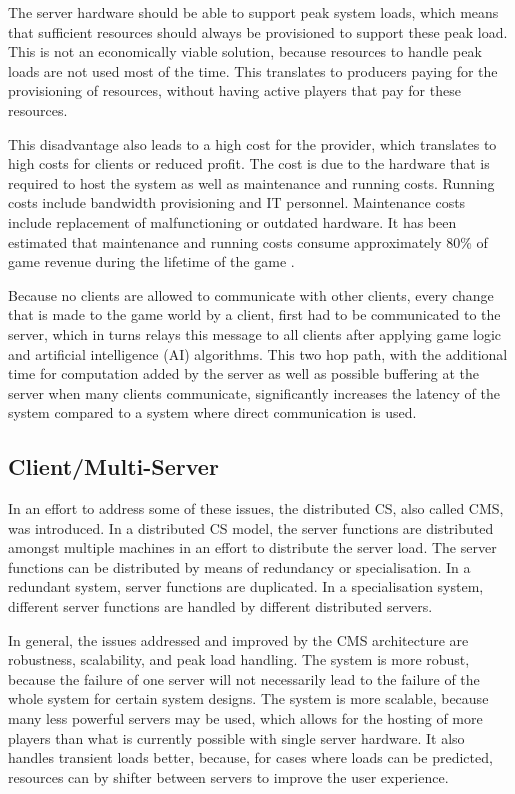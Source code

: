 \documentclass[10pt,a4paper,journal,cspaper,compsoc]{IEEEtran}
\begin{document}
The server hardware should be able to support peak system loads, which means that sufficient resources should always be provisioned to support these
peak load. This is not an economically viable solution, because resources to handle peak loads are not used most of the time. This translates to
producers paying for the provisioning of resources, without having active players that pay for these resources.

This disadvantage also leads to a high cost for the provider, which translates to high costs for clients or reduced profit. The cost is due to the
hardware that is required to host the system as well as maintenance and running costs. Running costs include bandwidth provisioning and IT personnel.
Maintenance costs include replacement of malfunctioning or outdated hardware. It has been estimated that maintenance and running costs consume
approximately 80\% of game revenue during the lifetime of the game \cite{cs_mmog_cost}.

Because no clients are allowed to communicate with other clients, every change that is made to the game world by a client, first had to be
communicated to the server, which in turns relays this message to all clients after applying game logic and artificial intelligence (AI) algorithms.
This two hop path, with the additional time for computation added by the server as well as possible buffering at the server when many clients
communicate, significantly increases the latency of the system compared to a system where direct communication is used.

\subsection{Client/Multi-Server}
In an effort to address some of these issues, the distributed \ac{CS}, also called \ac{CMS}, was introduced. In a distributed \ac{CS} model, the
server functions are distributed amongst multiple machines in an effort to distribute the server load. The server functions can be distributed by
means of redundancy or specialisation. In a redundant system, server functions are duplicated. In a specialisation system, different server functions
are handled by different distributed servers.

In general, the issues addressed and improved by the \ac{CMS} architecture are robustness, scalability, and peak load handling. The system is more
robust, because the failure of one server will not necessarily lead to the failure of the whole system for certain system designs. The system is more
scalable, because many less powerful servers may be used, which allows for the hosting of more players than what is currently possible with single
server hardware. It also handles transient loads better, because, for cases where loads can be predicted, resources can by shifter between servers to
improve the user experience.
\end{document}
